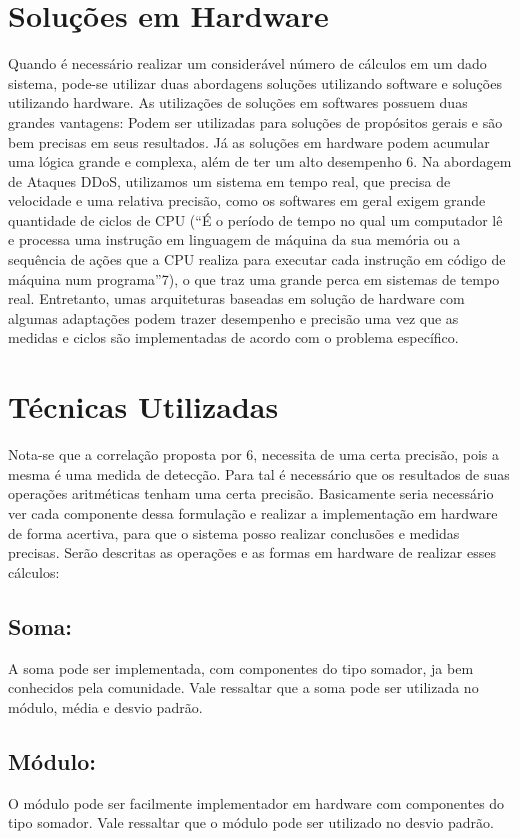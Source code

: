 \section{Soluções em Hardware}
			
Quando é necessário realizar um considerável número de cálculos em um dado sistema, pode-se utilizar duas abordagens soluções utilizando software e soluções utilizando hardware. As utilizações de soluções em softwares possuem duas grandes vantagens: Podem ser utilizadas para soluções de propósitos gerais e são bem precisas em seus resultados. Já as soluções em hardware podem acumular uma lógica grande e complexa, além  de ter um alto desempenho {6}.  Na abordagem de Ataques DDoS, utilizamos um sistema em tempo real, que precisa de velocidade e uma relativa precisão, como os softwares em geral exigem grande quantidade de ciclos de CPU (“É o período de tempo no qual um computador lê e processa uma instrução em linguagem de máquina da sua memória ou a sequência de ações que a CPU realiza para executar cada instrução em código de máquina num programa”{7}), o que traz uma grande perca em sistemas de tempo real. Entretanto, umas arquiteturas baseadas em solução de hardware com algumas adaptações podem trazer desempenho e precisão uma vez que as medidas e ciclos são implementadas de acordo com o problema específico.

\section{Técnicas Utilizadas}
Nota-se que a correlação proposta por {6}, necessita de uma certa precisão, pois a mesma é uma medida de detecção. Para tal é necessário que os resultados de suas operações aritméticas tenham uma certa precisão. Basicamente seria necessário ver cada componente dessa formulação e realizar a implementação em hardware de forma acertiva, para que o sistema posso realizar conclusões e medidas precisas. Serão descritas as operações e as formas em hardware de realizar esses cálculos:
	
	\subsection{Soma:} A soma pode ser implementada, com componentes do tipo somador, ja bem conhecidos pela comunidade. Vale ressaltar que a soma pode ser utilizada no módulo, média e desvio padrão.
	\subsection{Módulo:} O módulo pode ser facilmente implementador em hardware com componentes do tipo somador. Vale ressaltar que o módulo pode ser utilizado no desvio padrão.
